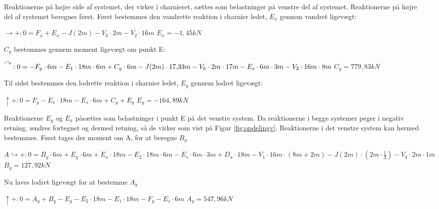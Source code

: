 Reaktionerne på højre side af systemet, der virker i charnieret, sættes som belastninger på venstre del af systemet. Reaktionerne på højre del af systemet beregnes først.
\newline
\newline
Først bestemmes den vandrette reaktion i charnier ledet, $E_x$ gennem vandret ligevægt: 
\begin{center}
	$\rightarrow+:0 = F_x + E_x - J(2m) - V_k \cdot 2m - V_2 \cdot 16m$
	\newline
	$E_x = -1,\!45 kN$
\end{center}

$C_y$ bestemmes gennem moment ligevægt om punkt E: 
\begin{center}
	$\AR{}:0 = -F_y \cdot 6m - E_1 \cdot 18m \cdot 6m + C_y \cdot 6m - J(2m) \cdot 17,\!33m - V_k \cdot 2m \cdot 17m - E_s \cdot 6m \cdot 3m - V_2 \cdot 16m \cdot 8m$
	\newline
	$C_y = 779,\!83 kN$
\end{center}

Til sidst bestemmes den lodrette reaktion i charnier ledet, $E_y$ gennem lodret ligevægt: 
\begin{center}
	$\uparrow+: 0 = F_y - E_1 \cdot 18m - E_s \cdot 6m + C_y + E_y$
	\newline	
	$E_y = -164,\!89 kN$
\end{center}

Reaktionerne $E_y$ og $E_x$ påsættes som belastninger i punkt E på det venstre system. Da reaktionerne i begge systemer peger i negativ retning, ændres fortegnet og dermed retning, så de virker som vist på Figur \ref{fig:opdelingv}.
\newline \indent{     } Reaktionerne i det venstre system kan hermed bestemmes.
\newline
\newline
Først tages der moment om A, for at beregne $B_y$  
\begin{center}
	$A\hookrightarrow+: 0 = B_y \cdot 6m + E_y \cdot 6m + E_x \cdot 18m - E_2 \cdot 18m \cdot 6m - E_s \cdot 6m \cdot 3m + D_x \cdot 18m - V_1 \cdot 16m \cdot (8m + 2m) - J(2m) \cdot (2m \cdot \frac{1}{3}) - V_k \cdot 2m \cdot 1m$
	\newline 
	$B_y = 127,\!92 kN$
\end{center}

Nu laves lodret ligevægt for at bestemme $A_y$
\begin{center}
	$\uparrow+: 0 = A_y + B_y - E_y - E_2 \cdot 18m - E_1 \cdot 18m - F_y - E_s \cdot 6 m$
	\newline
	$A_y = 547,\!96 kN$
\end{center}

